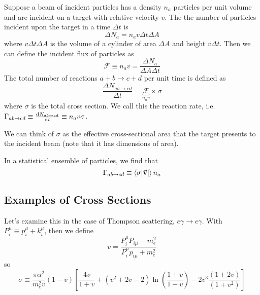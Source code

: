 \documentclass[a4paper,twoside,master.tex]{subfiles}
\begin{document}

Suppose a beam of incident particles has a density $ n_a $ particles per unit volume and are incident on a target with relative velocity $ v $. The the number of particles incident upon the target in a time $ \Delta t $ is
\begin{equation}
    \Delta N_a = n_a v \Delta t \Delta A
\end{equation}
where $ v \Delta t \Delta A $ is the volume of a cylinder of area $ \Delta A $ and height $ v \Delta t $. Then we can define the incident flux of particles as
\begin{equation}
    \mathcal{F} \equiv n_a v = \frac{\Delta N_a}{\Delta A \Delta t}
\end{equation}
The total number of reactions $ a + b \to c + d $ per unit time is defined as
\begin{equation}
    \frac{\Delta N_{ab \to cd}}{\Delta t} = \underbrace{\mathcal{F}}_{n_a v} \times \sigma
\end{equation}
where $ \sigma $ is the total cross section. We call this the reaction rate, i.e. $ \Gamma_{ab \to cd} \equiv \dv{N_{ab \to cd}}{t} \equiv n_a v \sigma $.

We can think of $ \sigma $ as the effective cross-sectional area that the target presents to the incident beam (note that it has dimensions of area).

In a statistical ensemble of particles, we find that
\begin{equation}
    \Gamma_{ab \to cd} \equiv \ev{\sigma \abs{\va{v}}} n_a
\end{equation}

\subsection{Examples of Cross Sections}\label{sub:examples_of_cross_sections}

Let's examine this in the case of Thompson scattering, $ e \gamma \to e \gamma $. With $ P_i^{\mu} \equiv p_i^{\mu} + k_i^{\mu} $, then we define
\begin{equation}
    v = \frac{P_i^{\mu} P_{i \mu} - m_e^2}{P^{\mu}_i p_{i \mu} + m_e^2}
\end{equation}
so
\begin{equation}
    \sigma \equiv \frac{\pi \alpha^2}{m_e^2 v} (1 - v)\left[ \frac{4 v}{1 + v} + (v^2 + 2v - 2) \ln(\frac{1 + v}{1 - v}) - 2 v^3 \frac{(1 + 2v)}{(1 + v^2)} \right]\tag{Klein-Nishina Cross Section}
\end{equation}
\end{document}
